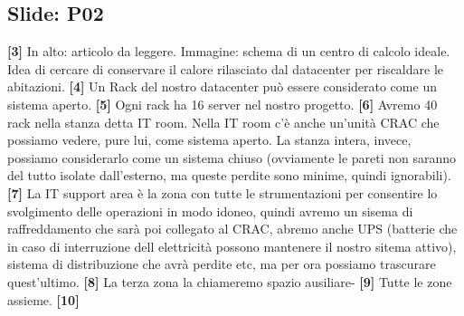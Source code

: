 \subsection*{Slide: P02}
\textbf{[3]}\; In alto: articolo da leggere. Immagine: schema di un centro di calcolo ideale. Idea di cercare di conservare il calore rilasciato dal datacenter per riscaldare le abitazioni.\newline
\textbf{[4]}\; Un Rack del nostro datacenter può essere considerato come un sistema aperto.\newline
\textbf{[5]}\; Ogni rack ha 16 server nel nostro progetto. \newline
\textbf{[6]}\; Avremo 40 rack nella stanza detta IT room. Nella IT room c'è anche un'unità CRAC che possiamo vedere, pure lui, come sistema aperto. La stanza intera, invece, possiamo considerarlo come un sistema chiuso (ovviamente le pareti non saranno del tutto isolate dall'esterno, ma queste perdite sono minime, quindi ignorabili).\newline
\textbf{[7]}\; La IT support area è la zona con tutte le strumentazioni per consentire lo svolgimento delle operazioni in modo idoneo, quindi avremo un sisema di raffreddamento che sarà poi collegato al CRAC, abremo anche UPS (batterie che in caso di interruzione dell elettricità possono mantenere il nostro sitema attivo), sistema di distribuzione che avrà perdite etc, ma per ora possiamo trascurare quest'ultimo.\newline
\textbf{[8]}\; La terza zona la chiameremo spazio ausiliare-\newline
\textbf{[9]}\; Tutte le zone assieme.\newline
\textbf{[10]}\;